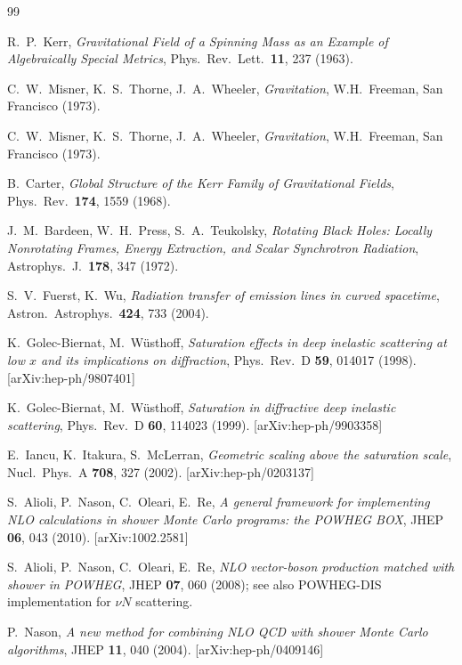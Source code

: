 \documentclass[11pt,a4paper]{article}
\begin{document}
\begin{thebibliography}{99}

R.~P.~Kerr, \textit{Gravitational Field of a Spinning Mass as an Example of Algebraically Special Metrics}, Phys.\ Rev.\ Lett.\ \textbf{11}, 237 (1963).

C.~W.~Misner, K.~S.~Thorne, J.~A.~Wheeler, \textit{Gravitation}, W.H.~Freeman, San Francisco (1973).

C.~W.~Misner, K.~S.~Thorne, J.~A.~Wheeler, \textit{Gravitation}, W.H.~Freeman, San Francisco (1973).

B.~Carter, \textit{Global Structure of the Kerr Family of Gravitational Fields}, Phys.\ Rev.\ \textbf{174}, 1559 (1968).

J.~M.~Bardeen, W.~H.~Press, S.~A.~Teukolsky, \textit{Rotating Black Holes: Locally Nonrotating Frames, Energy Extraction, and Scalar Synchrotron Radiation}, Astrophys.\ J.\ \textbf{178}, 347 (1972).

S.~V.~Fuerst, K.~Wu, \textit{Radiation transfer of emission lines in curved spacetime}, Astron.\ Astrophys.\ \textbf{424}, 733 (2004).

K.~Golec-Biernat, M.~W\"{u}sthoff, \textit{Saturation effects in deep inelastic scattering at low $x$ and its implications on diffraction}, Phys.\ Rev.\ D \textbf{59}, 014017 (1998). [arXiv:hep-ph/9807401]

K.~Golec-Biernat, M.~W\"{u}sthoff, \textit{Saturation in diffractive deep inelastic scattering}, Phys.\ Rev.\ D \textbf{60}, 114023 (1999). [arXiv:hep-ph/9903358]

E.~Iancu, K.~Itakura, S.~McLerran, \textit{Geometric scaling above the saturation scale}, Nucl.\ Phys.\ A \textbf{708}, 327 (2002). [arXiv:hep-ph/0203137]

S.~Alioli, P.~Nason, C.~Oleari, E.~Re, \textit{A general framework for implementing NLO calculations in shower Monte Carlo programs: the POWHEG BOX}, JHEP \textbf{06}, 043 (2010). [arXiv:1002.2581]

S.~Alioli, P.~Nason, C.~Oleari, E.~Re, \textit{NLO vector-boson production matched with shower in POWHEG}, JHEP \textbf{07}, 060 (2008); see also POWHEG-DIS implementation for $\nu N$ scattering.

P.~Nason, \textit{A new method for combining NLO QCD with shower Monte Carlo algorithms}, JHEP \textbf{11}, 040 (2004). [arXiv:hep-ph/0409146]


\end{thebibliography}
\end{document}
